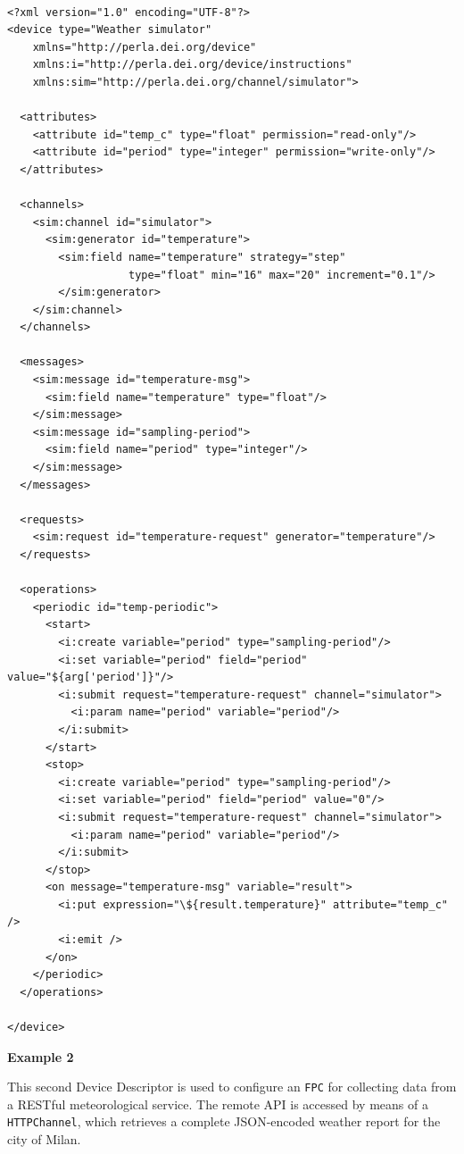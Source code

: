 ~\\
\lstset{language=XML}
\begin{lstlisting}
<?xml version="1.0" encoding="UTF-8"?>
<device type="Weather simulator"
    xmlns="http://perla.dei.org/device"
    xmlns:i="http://perla.dei.org/device/instructions"
    xmlns:sim="http://perla.dei.org/channel/simulator">

  <attributes>
    <attribute id="temp_c" type="float" permission="read-only"/>
    <attribute id="period" type="integer" permission="write-only"/>
  </attributes>

  <channels>
    <sim:channel id="simulator">
      <sim:generator id="temperature">
        <sim:field name="temperature" strategy="step"
                   type="float" min="16" max="20" increment="0.1"/>
        </sim:generator>
    </sim:channel>
  </channels>
  
  <messages>
    <sim:message id="temperature-msg">
      <sim:field name="temperature" type="float"/>
    </sim:message>
    <sim:message id="sampling-period">
      <sim:field name="period" type="integer"/>
    </sim:message>
  </messages>
  
  <requests>
    <sim:request id="temperature-request" generator="temperature"/>
  </requests>
  
  <operations>
    <periodic id="temp-periodic">
      <start>
        <i:create variable="period" type="sampling-period"/>
        <i:set variable="period" field="period" value="${arg['period']}"/>
        <i:submit request="temperature-request" channel="simulator">
          <i:param name="period" variable="period"/>
        </i:submit>
      </start>
      <stop>
        <i:create variable="period" type="sampling-period"/>
        <i:set variable="period" field="period" value="0"/>
        <i:submit request="temperature-request" channel="simulator">
          <i:param name="period" variable="period"/>
        </i:submit>
      </stop>
      <on message="temperature-msg" variable="result">
        <i:put expression="\${result.temperature}" attribute="temp_c" />
        <i:emit />
      </on>
    </periodic>
  </operations>

</device>
\end{lstlisting}

\textbf{Example 2}

This second Device Descriptor is used to configure an \texttt{FPC} for
collecting data from a RESTful meteorological service. The remote API is
accessed by means of a \texttt{HTTPChannel}, which retrieves a complete
JSON-encoded weather report for the city of Milan.

